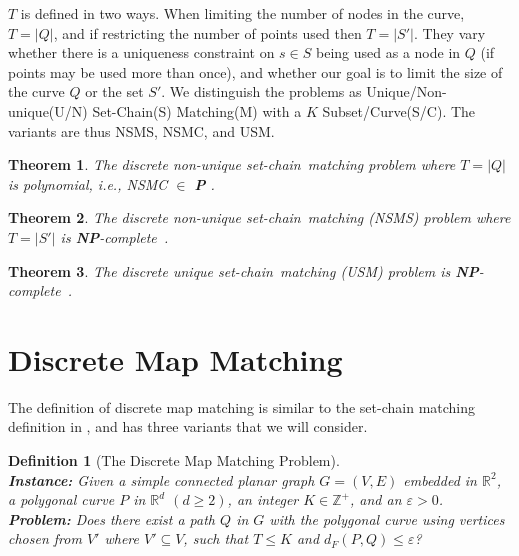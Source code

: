 \documentclass{article}[11pt]
\newcommand{\dfre}{d_F}
\newcommand{\npc}{\textbf{NP}-complete}
\newcommand{\scm}{set-chain}
\newcommand{\SCM}{Set-Chain}
\newtheorem{definition}{Definition}
\newtheorem{theorem}{Theorem}
\begin{document}
$T$ is defined in two ways.  When limiting the number of nodes in the curve, $T=|Q|$, and 
if restricting the number of points used then $T=|S'|$.
They vary whether 
there is a uniqueness constraint on $s \in S$ being used as a node in $Q$ (if points may be used more than once),
and whether our goal is to limit the size of the curve $Q$ or the set $S'$.  We distinguish the problems as
Unique/Non-unique(U/N) \SCM(S) Matching(M) with a $K$ Subset/Curve(S/C).  
The variants are thus NSMS, NSMC, and USM.

\begin{theorem} \label{thm:nsmck}
    The discrete non-unique \scm\ matching problem where $T=|Q|$ is polynomial, i.e., NSMC $\in$ \textbf{P} \cite{Wylie:2014:TCS}.
\end{theorem}

\begin{theorem} \label{thm:nsmsk}
    The discrete non-unique \scm\ matching (NSMS) problem where $T=|S'|$ is \npc\ \cite{Wylie:2014:TCS}.
\end{theorem}

\begin{theorem} \label{thm:usmck}
    The discrete unique \scm\ matching (USM) problem is \npc\ \cite{Wylie:2014:TCS}.
\end{theorem}




\section{Discrete Map Matching} \label{sec:dismmatch}


The definition of discrete map matching is similar to the set-chain matching definition 
in \cite{Wylie:2014:TCS}, and has three variants that we will consider.  


\begin{definition}[The Discrete Map Matching Problem]\hfill \\
    \noindent
    {\bf Instance:}
    Given a simple connected planar graph $G=(V,E)$ embedded in $\mathbb{R}^2$, 
    a polygonal curve $P$ in $\mathbb{R}^d$ $(d \geq 2)$, an integer $K \in \mathbb{Z}^+$,  
    and an $\varepsilon > 0$. \\
    \noindent
    {\bf Problem:}
    Does there exist a path $Q$ in $G$ with the polygonal curve using
    vertices chosen from $V'$ where $V' \subseteq V$, 
    such that $T \leq K$ and $\dfre(P,Q) \leq \varepsilon$?
\end{definition}
\end{document}
